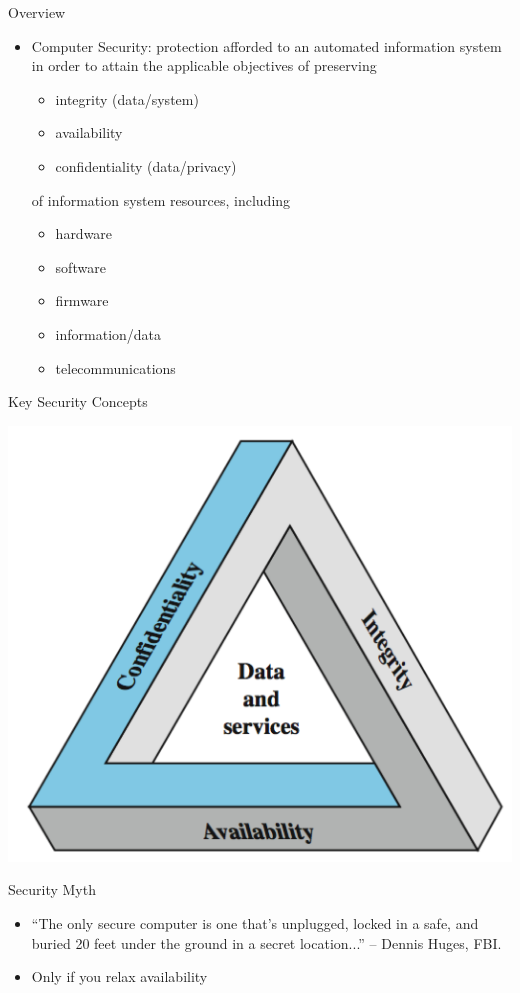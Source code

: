 \documentclass{beamer}
\begin{document}
\begin{frame}{Overview}
  \begin{itemize}
  \item \alert{Computer Security}: protection afforded to an 
    automated information system in order to attain 
    the applicable objectives of preserving
    
    \begin{itemize}
    \item integrity (data/system)
    \item availability
    \item confidentiality (data/privacy)
    \end{itemize}
of  information system resources, including
 
\begin{itemize}
  \item hardware
  \item software
  \item firmware
  \item information/data
  \item telecommunications
\end{itemize}
  \end{itemize}
\end{frame}


\begin{frame}{Key Security Concepts}
  \begin{center}
    \includegraphics[width=0.7\linewidth]{concepts}
  \end{center}
\end{frame}

\begin{frame}{Security Myth}
  
  \begin{itemize}
\item   ``The only secure computer is one that's unplugged, locked in a safe,
  and buried 20 feet under the ground in a secret location...'' --
  Dennis Huges, FBI.
\item<2-> Only if you relax availability
  \end{itemize}
\end{frame}
\end{document}
